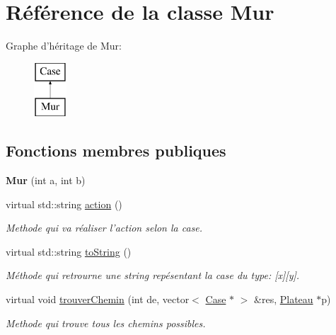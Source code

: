 \hypertarget{classMur}{\section{\-Référence de la classe \-Mur}
\label{classMur}
}
\-Graphe d'héritage de \-Mur\-:\begin{figure}[H]
\begin{center}
\leavevmode
\includegraphics[height=2.000000cm]{classMur}
\end{center}
\end{figure}
\subsection*{\-Fonctions membres publiques}
\begin{DoxyCompactItemize}
\item 
\hypertarget{classMur_a3e7b1afaccb62ba5fa7cc8e1728e7dff}{{\bfseries \-Mur} (int a, int b)}\label{classMur_a3e7b1afaccb62ba5fa7cc8e1728e7dff}

\item 
\hypertarget{classMur_a0fda0e8825c34a5f06d651e263bff058}{virtual std\-::string \hyperlink{classMur_a0fda0e8825c34a5f06d651e263bff058}{action} ()}\label{classMur_a0fda0e8825c34a5f06d651e263bff058}

\begin{DoxyCompactList}\small\item\em \-Methode qui va réaliser l'action selon la case. \end{DoxyCompactList}\item 
virtual std\-::string \hyperlink{classMur_a8d319947a0158801579dc5f1f8568281}{to\-String} ()
\begin{DoxyCompactList}\small\item\em \-Méthode qui retrourne une string repésentant la case du type\-: \mbox{[}x\mbox{]}\mbox{[}y\mbox{]}. \end{DoxyCompactList}\item 
virtual void \hyperlink{classMur_a83a304537e5863c25ce60879196d8e6e}{trouver\-Chemin} (int de, vector$<$ \hyperlink{classCase}{\-Case} $\ast$ $>$ \&res, \hyperlink{classPlateau}{\-Plateau} $\ast$p)
\begin{DoxyCompactList}\small\item\em \-Methode qui trouve tous les chemins possibles. \end{DoxyCompactList}\end{DoxyCompactItemize}


